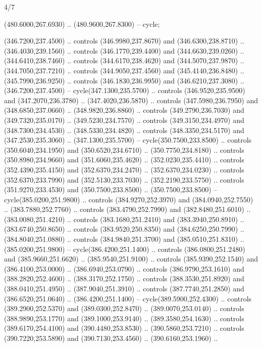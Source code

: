\begin{flagdescription}{4/7}
\begin{scope}[shift={(0.5\flaglength,0.5\flagwidth)},scale=\flagwidth*\stretchfactor/820]
\begin{scope}[scale=1.87,xshift=-138mm,yshift=75mm]
\begin{scope}[y=0.8pt, x=0.8pt, yscale=-1, xscale=1]
\begin{scope}[cm={{1.16833,0.0,0.0,1.16833,(-0.699,1.184)}}]
\begin{scope}[fill=ce92736]
  (480.6000,267.6930) .. (480.9600,267.8300) -- cycle;
 \end{scope}
\path[fill=cf7e204] %
  (346.7200,237.4500) .. controls (346.9980,237.8670) and
  (346.6300,238.8710) .. (346.4030,239.1560) .. controls (346.1770,239.4400) and
  (344.6630,239.0260) .. (344.6410,238.7460) .. controls (344.6170,238.4620) and
  (344.5070,237.9870) .. (344.7050,237.7210) .. controls (344.9050,237.4560) and
  (345.4140,236.8480) .. (345.7990,236.9250) .. controls (346.1830,236.9950) and
  (346.6210,237.3080) .. (346.7200,237.4500) -- cycle(347.1300,235.5700) ..
  controls (346.9520,235.9500) and (347.2070,236.3780) .. (347.4020,236.5870) ..
  controls (347.5980,236.7950) and (348.6850,237.0660) .. (348.9820,236.8860) ..
  controls (349.2790,236.7030) and (349.7320,235.0170) .. (349.5230,234.7570) ..
  controls (349.3150,234.4970) and (348.7300,234.4530) .. (348.5330,234.4820) ..
  controls (348.3350,234.5170) and (347.2530,235.3060) .. (347.1300,235.5700) --
  cycle(350.7500,233.8500) .. controls (350.6040,234.1950) and
  (350.6520,234.6710) .. (350.7750,234.8180) .. controls (350.8980,234.9660) and
  (351.6060,235.4620) .. (352.0230,235.4410) .. controls (352.4390,235.4150) and
  (352.6370,234.2470) .. (352.6370,234.0230) .. controls (352.6370,233.7990) and
  (352.5130,233.7030) .. (352.2190,233.5750) .. controls (351.9270,233.4530) and
  (350.7500,233.8500) .. (350.7500,233.8500) -- cycle(385.0200,251.9800) ..
  controls (384.9270,252.3970) and (384.0940,252.7550) .. (383.7880,252.7760) ..
  controls (383.4790,252.7990) and (382.8480,251.6010) .. (383.0080,251.4210) ..
  controls (383.1680,251.2410) and (383.3940,250.8910) .. (383.6740,250.8650) ..
  controls (383.9520,250.8350) and (384.6250,250.7990) .. (384.8040,251.0880) ..
  controls (384.9840,251.3700) and (385.0510,251.8310) .. (385.0200,251.9800) --
  cycle(386.4200,251.1400) .. controls (386.0800,251.2480) and
  (385.9660,251.6620) .. (385.9540,251.9100) .. controls (385.9390,252.1540) and
  (386.4100,253.0000) .. (386.6940,253.0790) .. controls (386.9790,253.1610) and
  (388.2820,252.4600) .. (388.3170,252.1750) .. controls (388.3530,251.8920) and
  (388.0410,251.4950) .. (387.9040,251.3910) .. controls (387.7740,251.2850) and
  (386.6520,251.0640) .. (386.4200,251.1400) -- cycle(389.5900,252.4300) ..
  controls (389.2900,252.5370) and (389.0300,252.8470) .. (389.0070,253.0140) ..
  controls (388.9890,253.1770) and (389.1000,253.9140) .. (389.3580,254.1630) ..
  controls (389.6170,254.4100) and (390.4480,253.8530) .. (390.5860,253.7210) ..
  controls (390.7220,253.5890) and (390.7130,253.4560) .. (390.6160,253.1960) ..

\end{scope}
\end{scope}
\end{scope}
\end{scope}
\end{flagdescription}
